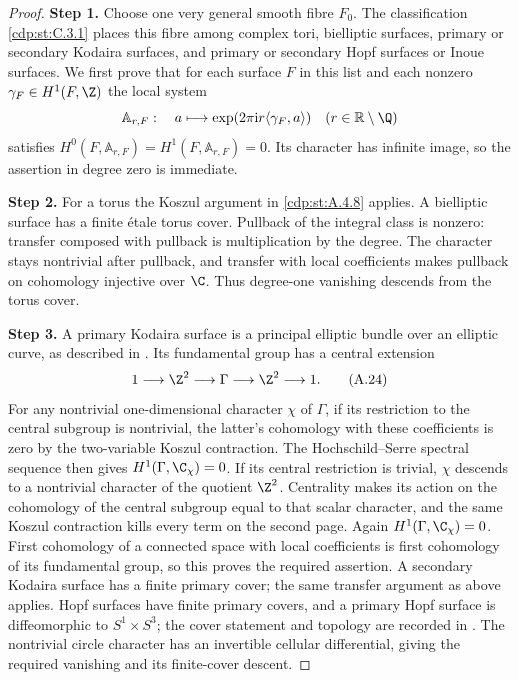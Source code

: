 \begin{proof}
\noindent\textbf{Step 1.} Choose one very general smooth fibre $F_0$. The classification \ref{cdp:st:C.3.1} places this fibre among complex tori, bielliptic surfaces, primary or secondary Kodaira surfaces, and primary or secondary Hopf surfaces or Inoue surfaces. We first prove that for each surface $F$ in this list and each nonzero $\gamma_F\in H^1(F,\Z)$ the local system
\[
 \mathbb A_{r,F}:\quad a\longmapsto
       \exp(2\pi\mathrm i r\langle\gamma_F,a\rangle)
 \quad(r\in\mathbb R\setminus\Q)
\]
satisfies $H^0(F,\mathbb A_{r,F})=H^1(F,\mathbb A_{r,F})=0$. Its character has infinite image, so the assertion in degree zero is immediate.

\noindent\textbf{Step 2.} For a torus the Koszul argument in \ref{cdp:st:A.4.8} applies. A bielliptic surface has a finite étale torus cover. Pullback of the integral class is nonzero: transfer composed with pullback is multiplication by the degree. The character stays nontrivial after pullback, and transfer with local coefficients makes pullback on cohomology injective over $\C$. Thus degree-one vanishing descends from the torus cover.

\noindent\textbf{Step 3.} A primary Kodaira surface is a principal elliptic bundle over an elliptic curve, as described in \cite[\S1 and the central-extension diagram in the proof of Lemma~1.1]{SS2002}. Its fundamental group has a central extension
\[
 1\longrightarrow\Z^2\longrightarrow\Gamma\longrightarrow\Z^2
       \longrightarrow1.
 \tag{A.24}\label{cdp:eq:A.24}
\]
For any nontrivial one-dimensional character $\chi$ of $\Gamma$, if its restriction to the central subgroup is nontrivial, the latter's cohomology with these coefficients is zero by the two-variable Koszul contraction. The Hochschild--Serre spectral sequence then gives $H^1(\Gamma,\C_\chi)=0$. If its central restriction is trivial, $\chi$ descends to a nontrivial character of the quotient $\Z^2$. Centrality makes its action on the cohomology of the central subgroup equal to that scalar character, and the same Koszul contraction kills every term on the second page. Again $H^1(\Gamma,\C_\chi)=0$. First cohomology of a connected space with local coefficients is first cohomology of its fundamental group, so this proves the required assertion. A secondary Kodaira surface has a finite primary cover; the same transfer argument as above applies. Hopf surfaces have finite primary covers, and a primary Hopf surface is diffeomorphic to $S^1\times S^3$; the cover statement and topology are recorded in \cite[\S2.1.1 and Theorem~2.2]{Albanese2020}. The nontrivial circle character has an invertible cellular differential, giving the required vanishing and its finite-cover descent.


\end{proof}
